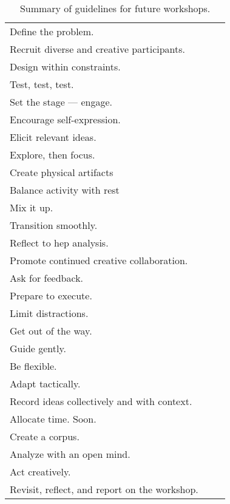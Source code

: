 \begin{table}
    \centering
    \begin{tabular}{|p{0.9\linewidth}|}
    \hline
    Define the problem. \\
    Recruit diverse and creative participants. \\
    Design within constraints. \\
    Test, test, test. \\
    \hline
    Set the stage --- engage.\\
    Encourage self-expression. \\
    Elicit relevant ideas. \\
    Explore, then focus. \\
    Create physical artifacts \\
    Balance activity with rest \\
    Mix it up.\\
    Transition smoothly. \\
    Reflect to hep analysis.\\
    Promote continued creative collaboration. \\
    Ask for feedback. \\
    \hline
    Prepare to execute. \\
    Limit distractions. \\
    Get out of the way. \\
    Guide gently. \\
    Be flexible. \\
    Adapt tactically. \\
    Record ideas collectively and with context. \\
    \hline
    Allocate time. Soon. \\
    Create a corpus. \\
    Analyze with an open mind. \\
    Act creatively.\\
    Revisit, reflect, and report on the workshop. \\
    \hline
    \end{tabular}
    \caption{Summary of guidelines for future workshops.}
    \label{tab:design-considerations}
\end{table}
